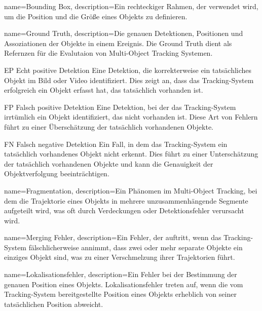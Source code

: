 {
name=Bounding Box,
description={Ein rechteckiger Rahmen, der verwendet wird, um die Position und die Größe eines Objekts zu definieren.}
}

{
name=Ground Truth,
description={Die genauen Detektionen, Positionen und Assoziationen der Objekte in einem Ereignis. Die Ground Truth dient als Refernzen für die Evalutaion von Multi-Object Tracking Systemen.}
}




\newglossaryentrywithacronym
{EP}
{Echt positive Detektion}
{Eine Detektion, die korrekterweise ein tatsächliches Objekt im Bild oder Video identifiziert. Dies zeigt an, dass das Tracking-System erfolgreich ein Objekt erfasst hat, das tatsächlich vorhanden ist.}

\newglossaryentrywithacronym
{FP}
{Falsch positive Detektion}
{Eine Detektion, bei der das Tracking-System irrtümlich ein Objekt identifiziert, das nicht vorhanden ist. Diese Art von Fehlern führt zu einer Überschätzung der tatsächlich vorhandenen Objekte.}

\newglossaryentrywithacronym
{FN}
{Falsch negative Detektion}
{Ein Fall, in dem das Tracking-System ein tatsächlich vorhandenes Objekt nicht erkennt. Dies führt zu einer Unterschätzung der tatsächlich vorhandenen Objekte und kann die Genauigkeit der Objektverfolgung beeinträchtigen.}

{
name=Fragmentation,
description={Ein Phänomen im Multi-Object Tracking, bei dem die Trajektorie eines Objekts in mehrere unzusammenhängende Segmente aufgeteilt wird, was oft durch Verdeckungen oder Detektionsfehler verursacht wird.}
}

{
name=Merging Fehler,
description={Ein Fehler, der auftritt, wenn das Tracking-System fälschlicherweise annimmt, dass zwei oder mehr separate Objekte ein einziges Objekt sind, was zu einer Verschmelzung ihrer Trajektorien führt.}
}

{
name=Lokalisationsfehler,
description={Ein Fehler bei der Bestimmung der genauen Position eines Objekts. Lokalisationsfehler treten auf, wenn die vom Tracking-System bereitgestellte Position eines Objekts erheblich von seiner tatsächlichen Position abweicht.}
}

